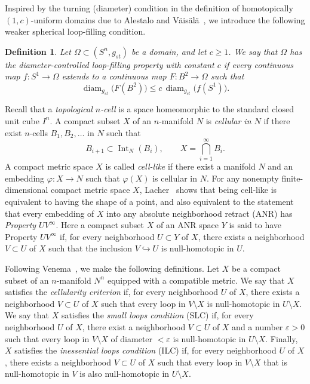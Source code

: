 \documentclass[12pt,oneside,a4paper]{article}
\newtheorem{definition}{Definition}[section]
\theoremstyle{mytheorem}
\theoremstyle{remark}
\theoremstyle{definition}
\begin{document}
Inspired by the turning (diameter) condition in the definition of
homotopically \((1,c)\)-uniform domains due to Alestalo and
V\"ais\"al\"a~\cite{MR1404095}, we introduce the following weaker spherical
loop-filling condition.
\begin{definition}
Let \(\Omega\subset (S^n,g_{st})\) be a domain, and let \(c\ge 1\).
We say that \(\Omega\) has the \emph{diameter-controlled loop-filling property
with constant \(c\)} if every continuous map $f\colon S^1\to \Omega$
extends to a continuous map
$F\colon B^2\to \Omega$
such that
\[
\operatorname{diam}_{g_{st}}\bigl(F(B^2)\bigr)
\le c\,\operatorname{diam}_{g_{st}}\bigl(f(S^1)\bigr).
\]
\end{definition}

Recall that a \emph{topological \(n\)-cell} is a space homeomorphic to the standard closed unit cube \(I^n\). A compact subset \(X\) of an \(n\)-manifold \(N\) is \emph{cellular in \(N\)} if there exist \(n\)-cells \(B_1,B_2,\dots\) in \(N\) such that
\[
B_{i+1}\subset\operatorname{Int}_N(B_i),
\qquad
X=\bigcap_{i=1}^{\infty}B_i.
\]
A compact metric space \(X\) is called \emph{cell-like} if there exist a manifold \(N\) and an embedding \(\varphi\colon X\to N\) such that \(\varphi(X)\) is cellular in \(N\). For any nonempty finite-dimensional compact metric space \(X\), Lacher~\cite[Theorem~1.1]{zbMATH03290989}
shows that being cell-like is
equivalent to having the shape of a point, and also equivalent to the
statement that every embedding of \(X\) into any absolute neighborhood retract (ANR) has \emph{Property \(UV^{\infty}\)}. Here a compact subset \(X\) of an ANR space \(Y\) is said to have Property \(UV^{\infty}\) if, for every neighborhood \(U\subset Y\) of \(X\), there exists a neighborhood \(V\subset U\) of \(X\) such that the inclusion \(V\hookrightarrow U\) is null-homotopic in \(U\).

Following Venema~\cite{zbMATH03519593}, we make the following definitions. Let \(X\) be a compact subset of an \(n\)-manifold \(N^n\) equipped with a compatible metric. We say that \(X\) satisfies the
\emph{cellularity criterion} if, for every neighborhood \(U\) of \(X\), there
exists a neighborhood \(V\subset U\) of \(X\) such that every loop in
\(V\setminus X\) is null-homotopic in \(U\setminus X\). We say that \(X\)
satisfies the \emph{small loops condition} (SLC) if, for every neighborhood
\(U\) of \(X\), there exist a neighborhood \(V\subset U\) of \(X\) and a number
\(\varepsilon>0\) such that every loop in \(V\setminus X\) of diameter \(<\varepsilon\)
is null-homotopic in \(U\setminus X\). Finally, \(X\) satisfies the
\emph{inessential loops condition} (ILC) if, for every neighborhood \(U\) of
\(X\), there exists a neighborhood \(V\subset U\) of \(X\) such that every loop
in \(V\setminus X\) that is null-homotopic in \(V\) is also null-homotopic in
\(U\setminus X\).
\end{document}
